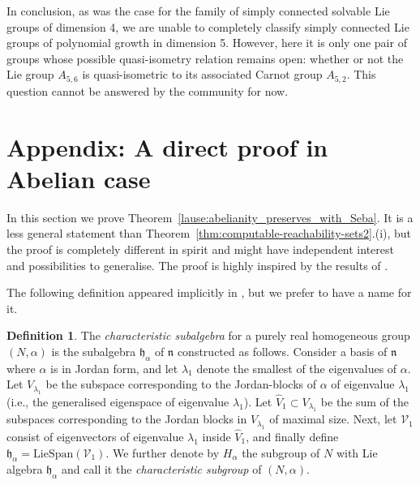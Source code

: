 \documentclass[a4paper,12pt]{amsart}
\newcommand{\pp}{\mathrm}
\theoremstyle{plain}
\theoremstyle{definition}
\newtheorem{maar}{Definition}[section]
\theoremstyle{plain}
\theoremstyle{remark}
\begin{document}
In conclusion, as was the case for the family of simply connected solvable Lie groups of dimension 4, we are unable to completely classify simply connected Lie groups of polynomial growth in dimension 5. However, here it is only one pair of groups whose possible quasi-isometry relation remains open: whether or not the Lie group \( A_{5,6} \) is quasi-isometric to its associated Carnot group \( A_{5,2} \). This question cannot be answered by the community for now.











\section{Appendix: A direct proof in Abelian case}

\label{sec:abelian-theorem}

In this section we prove Theorem~\ref{lause:abelianity_preserves_with_Seba}. It is a less general statement than Theorem~\ref{thm:computable-reachability-sets2}.(i), but the proof is completely different in spirit and might have independent interest and possibilities to generalise. The proof is highly inspired by the results of \cite{avain:CPS}.

The following definition appeared implicitly in \cite{avain:CPS}, but we prefer to have a name for it.

\begin{maar} \label{maar:characteristic_subgroup}
	The \emph{characteristic subalgebra} for  a purely real homogeneous group \( (N,\alpha) \) is the subalgebra \( \mathfrak{h}_\alpha \) of \( \mathfrak{n} \) constructed as follows. 
	Consider a basis of \( \mathfrak{n} \) where \( \alpha \) is in Jordan form, and 
	let \( \lambda_1 \) denote the smallest of the eigenvalues of \( \alpha \).
	Let \( V_{\lambda_1} \) be the subspace corresponding to the Jordan-blocks of \( \alpha\) of eigenvalue \( \lambda_1 \)  (i.e., the generalised eigenspace of eigenvalue \( \lambda_1\)). Let \( \hat{V}_1 \subset V_{\lambda_1} \) be the sum of the subspaces corresponding to the Jordan blocks in \( V_{\lambda_1} \) of maximal size. Next, let \( \mathcal{V}_1 \) consist of eigenvectors of eigenvalue \( \lambda_1 \)  inside \( \hat{V}_1 \), and finally define \( \mathfrak{h}_\alpha = \pp{LieSpan}(\mathcal{V}_1) \). 
	We further denote by \( H_\alpha \) the subgroup of \( N \) with Lie algebra \( \mathfrak{h}_\alpha \) and call it the \emph{characteristic subgroup} of \( (N,\alpha) \).
\end{maar}
\end{document}
